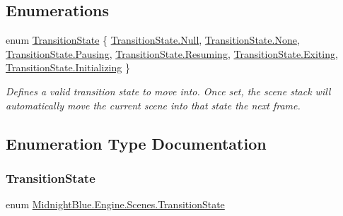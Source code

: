 \subsection*{Enumerations}
\begin{DoxyCompactItemize}
\item 
enum \hyperlink{namespace_midnight_blue_1_1_engine_1_1_scenes_a829c47ebe553886b3b3e92db386e2557}{Transition\+State} \{ \newline
\hyperlink{namespace_midnight_blue_1_1_engine_1_1_scenes_a829c47ebe553886b3b3e92db386e2557abbb93ef26e3c101ff11cdd21cab08a94}{Transition\+State.\+Null}, 
\hyperlink{namespace_midnight_blue_1_1_engine_1_1_scenes_a829c47ebe553886b3b3e92db386e2557a6adf97f83acf6453d4a6a4b1070f3754}{Transition\+State.\+None}, 
\hyperlink{namespace_midnight_blue_1_1_engine_1_1_scenes_a829c47ebe553886b3b3e92db386e2557af89bf2973f11fc8bac3db5669252725a}{Transition\+State.\+Pausing}, 
\hyperlink{namespace_midnight_blue_1_1_engine_1_1_scenes_a829c47ebe553886b3b3e92db386e2557a69f55169cdb3caab27ba9f347bf05354}{Transition\+State.\+Resuming}, 
\newline
\hyperlink{namespace_midnight_blue_1_1_engine_1_1_scenes_a829c47ebe553886b3b3e92db386e2557a0657d962b72e6f1f37dda8dad3684cb8}{Transition\+State.\+Exiting}, 
\hyperlink{namespace_midnight_blue_1_1_engine_1_1_scenes_a829c47ebe553886b3b3e92db386e2557a32b169f72b293ef80d35435e9894f8e2}{Transition\+State.\+Initializing}
 \}\begin{DoxyCompactList}\small\item\em Defines a valid transition state to move into. Once set, the scene stack will automatically move the current scene into that state the next frame. \end{DoxyCompactList}
\end{DoxyCompactItemize}


\subsection{Enumeration Type Documentation}
\hypertarget{namespace_midnight_blue_1_1_engine_1_1_scenes_a829c47ebe553886b3b3e92db386e2557}{}\label{namespace_midnight_blue_1_1_engine_1_1_scenes_a829c47ebe553886b3b3e92db386e2557} 
\subsubsection{\texorpdfstring{Transition\+State}{TransitionState}}
{\footnotesize\ttfamily enum \hyperlink{namespace_midnight_blue_1_1_engine_1_1_scenes_a829c47ebe553886b3b3e92db386e2557}{Midnight\+Blue.\+Engine.\+Scenes.\+Transition\+State}\hspace{0.3cm}{\ttfamily [strong]}}



